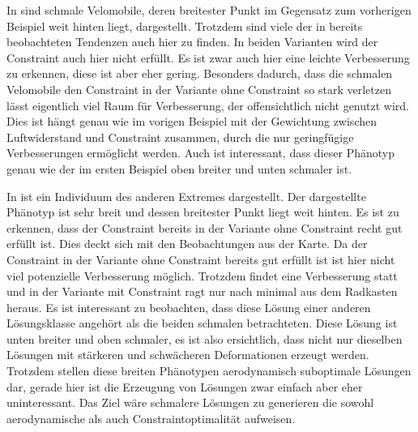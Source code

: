 
In  sind schmale Velomobile, deren breitester Punkt im Gegensatz zum vorherigen Beispiel weit hinten liegt, dargestellt.
Trotzdem sind viele der in  bereits beobachteten Tendenzen auch hier zu finden.
In beiden Varianten wird der Constraint auch hier nicht erfüllt.
Es ist zwar auch hier eine leichte Verbesserung zu erkennen, diese ist aber eher gering.
Besonders dadurch, dass die schmalen Velomobile den Constraint in der Variante ohne Constraint so stark verletzen lässt eigentlich viel Raum für Verbesserung, der offensichtlich nicht genutzt wird.
Dies ist hängt genau wie im vorigen Beispiel mit der Gewichtung zwischen Luftwiderstand und Constraint zusammen, durch die nur geringfügige Verbesserungen ermöglicht werden.
Auch ist interessant, dass dieser Phänotyp genau wie der im ersten Beispiel oben breiter und unten schmaler ist.




In  ist ein Individuum des anderen Extremes dargestellt.
Der dargestellte Phänotyp ist sehr breit und dessen breitester Punkt liegt weit hinten.
Es ist zu erkennen, dass der Constraint bereits in der Variante ohne Constraint recht gut erfüllt ist.
Dies deckt sich mit den Beobachtungen aus der Karte.
Da der Constraint in der Variante ohne Constraint bereits gut erfüllt ist ist hier nicht viel potenzielle Verbesserung möglich.
Trotzdem findet eine Verbesserung statt und in der Variante mit Constraint ragt nur nach minimal aus dem Radkasten heraus.
Es ist interessant zu beobachten, dass diese Lösung einer anderen Lösungsklasse angehört als die beiden schmalen betrachteten.
Diese Lösung ist unten breiter und oben schmaler, es ist also ersichtlich, dass nicht nur dieselben Lösungen mit stärkeren und schwächeren Deformationen erzeugt werden.
Trotzdem stellen diese breiten Phänotypen aerodynamisch suboptimale Lösungen dar, gerade hier ist die Erzeugung von Lösungen zwar einfach aber eher uninteressant.
Das Ziel wäre schmalere Lösungen zu generieren die sowohl aerodynamische als auch Constraintoptimalität aufweisen.


